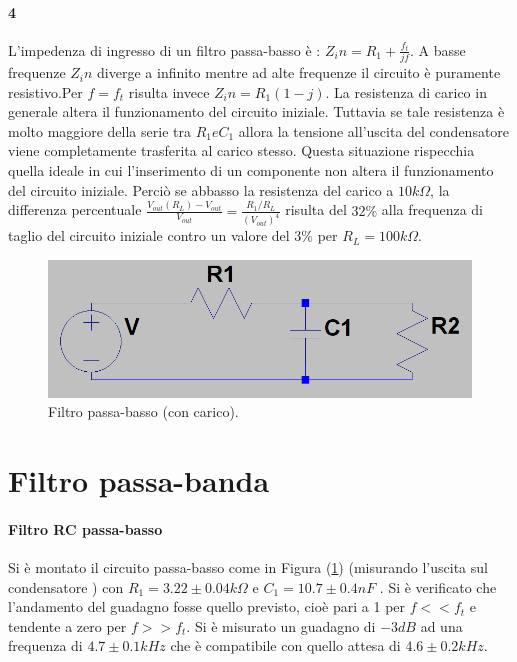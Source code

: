 \documentclass[10pt,a4paper]{article}
\begin{document}
\paragraph{4  }
L'impedenza di ingresso di un filtro passa-basso è : $Z_in = R_1 + \frac{f_t}{jf} $. A basse frequenze $Z_in$ diverge a infinito mentre ad alte frequenze il circuito è puramente resistivo.Per $f=f_t$ risulta invece $Z_in = R_1(1-j)$. 
La resistenza di carico in generale altera il funzionamento del circuito iniziale. Tuttavia se tale resistenza è molto maggiore della serie tra $R_1 e C_1$ allora la tensione all'uscita del condensatore viene completamente trasferita al carico stesso. Questa situazione rispecchia quella ideale in cui l'inserimento di un componente non altera il funzionamento del circuito iniziale. Perciò se abbasso la resistenza del carico a $10 k\Omega$, la differenza percentuale  $\frac{V_{out}(R_L)-V_{out}}{V_{out}} = \frac{R_1/R_L}{(V_{out})^4}$ risulta del $32 \%$ alla frequenza di taglio del circuito iniziale contro un valore del $3 \%$ per $R_L=100 k\Omega$.

\begin{figure}
	\centering
	\includegraphics[scale=0.4]{passa_basso.png}
	\caption{Filtro passa-basso (con carico).\label{f:p-basso}}
\end{figure}


\section{Filtro passa-banda}
\paragraph{Filtro RC passa-basso}
Si è montato il circuito passa-basso come in Figura (\ref{f:p-basso}) (misurando l'uscita sul condensatore ) con $R_1= 3.22 \pm 0.04 k\Omega $ e $C_1= 10.7 \pm 0.4 nF $ . Si è verificato che l'andamento del guadagno fosse quello previsto, cioè pari a 1 per $f << f_t$ e tendente a zero per $f>> f_t$. Si è misurato un guadagno di $-3 dB$ ad una frequenza di $4.7 \pm 0.1 kHz$  che è compatibile con quello attesa di $4.6 \pm 0.2 kHz$.
\end{document}

